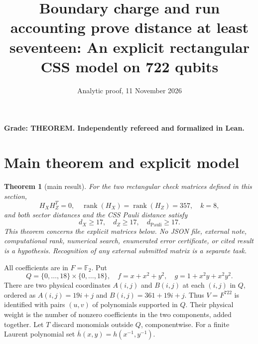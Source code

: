 \documentclass{article}
\title{Boundary charge and run accounting prove distance at least seventeen: An explicit rectangular CSS model on 722 qubits}
\author{}
\date{Analytic proof, 11 November 2026}
\newtheorem{theorem}{Theorem}
\DeclareMathOperator{\rank}{rank}
\newcommand{\Ftwo}{\mathbb{F}_2}
\begin{document}
\maketitle

\textbf{Grade: THEOREM. Independently refereed and formalized in Lean.}

\section{Main theorem and explicit model}\label{sec:model}

\begin{theorem}[main result]\label{thm:main}
  For the two rectangular check matrices defined in this section,
  \begin{equation}
    H_X H_Z^T = 0, \quad
    \rank(H_X) = \rank(H_Z) = 357, \quad k = 8,
  \end{equation}
  and both sector distances and the CSS Pauli distance satisfy
  \begin{equation}
    d_X \ge 17, \quad d_Z \ge 17, \quad d_{\text{Pauli}} \ge 17.
  \end{equation}
  This theorem concerns the explicit matrices below. No JSON file, external note,
  computational rank, numerical search, enumerated error certificate, or cited result is a
  hypothesis. Recognition of any external submitted matrix is a separate task.
\end{theorem}

All coefficients are in \(F = \Ftwo\). Put
\begin{equation}
  Q = \{0, \dots, 18\} \times \{0, \dots, 18\}, \quad
  f = x + x^2 + y^2, \quad g = 1 + x^2 y + x^2 y^2.
\end{equation}
There are two physical coordinates \(A(i,j)\) and \(B(i,j)\) at each \((i,j)\) in \(Q\),
ordered as \(A(i,j) = 19i + j\) and \(B(i,j) = 361 + 19i + j\). Thus \(V = F^{722}\) is
identified with pairs \((u,v)\) of polynomials supported in \(Q\). Their physical weight is
the number of nonzero coefficients in the two components, added together. Let \(T\) discard
monomials outside \(Q\), componentwise. For a finite Laurent polynomial set
\(\overline{h}(x,y) = h(x^{-1}, y^{-1})\).
\end{document}
